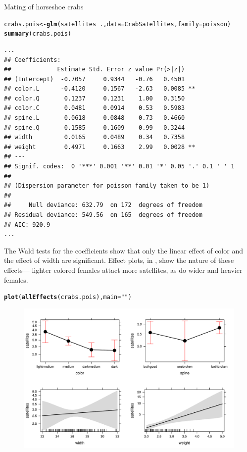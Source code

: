 \documentclass[11pt]{book}\usepackage[]{graphicx}\usepackage[]{color}
\makeatletter
\newcommand{\hlstr}[1]{\textcolor[rgb]{0.192,0.494,0.8}{#1}}%
\newcommand{\hlopt}[1]{\textcolor[rgb]{0,0,0}{#1}}%
\newcommand{\hlstd}[1]{\textcolor[rgb]{0.345,0.345,0.345}{#1}}%
\newcommand{\hlkwb}[1]{\textcolor[rgb]{0.69,0.353,0.396}{#1}}%
\newcommand{\hlkwc}[1]{\textcolor[rgb]{0.333,0.667,0.333}{#1}}%
\newcommand{\hlkwd}[1]{\textcolor[rgb]{0.737,0.353,0.396}{\textbf{#1}}}%
\newenvironment{kframe}{%
 \def\at@end@of@kframe{}%
 \ifinner\ifhmode%
  \def\at@end@of@kframe{\end{minipage}}%
  \begin{minipage}{\columnwidth}%
 \fi\fi%
 \def\FrameCommand##1{\hskip\@totalleftmargin \hskip-\fboxsep
 \colorbox{shadecolor}{##1}\hskip-\fboxsep
     \hskip-\linewidth \hskip-\@totalleftmargin \hskip\columnwidth}%
 \MakeFramed {\advance\hsize-\width
   \@totalleftmargin\z@ \linewidth\hsize
   \@setminipage}}%
 {\par\unskip\endMakeFramed%
 \at@end@of@kframe}
\newenvironment{knitrout}{}{} %
\renewenvironment{knitrout}{\small\renewcommand{\baselinestretch}{.85}}{} %
\makeatother
\begin{document}
\begin{Example}[crabs1]{Mating of horseshoe crabs}
\begin{knitrout}
\color{fgcolor}\begin{kframe}
\begin{alltt}
\hlstd{crabs.pois} \hlkwb{<-} \hlkwd{glm}\hlstd{(satellites} \hlopt{~} \hlstd{.,} \hlkwc{data}\hlstd{=CrabSatellites,} \hlkwc{family}\hlstd{=poisson)}
\hlkwd{summary}\hlstd{(crabs.pois)}
\end{alltt}
\begin{verbatim}
...
## Coefficients:
##             Estimate Std. Error z value Pr(>|z|)   
## (Intercept)  -0.7057     0.9344   -0.76   0.4501   
## color.L      -0.4120     0.1567   -2.63   0.0085 **
## color.Q       0.1237     0.1231    1.00   0.3150   
## color.C       0.0481     0.0914    0.53   0.5983   
## spine.L       0.0618     0.0848    0.73   0.4660   
## spine.Q       0.1585     0.1609    0.99   0.3244   
## width         0.0165     0.0489    0.34   0.7358   
## weight        0.4971     0.1663    2.99   0.0028 **
## ---
## Signif. codes:  0 '***' 0.001 '**' 0.01 '*' 0.05 '.' 0.1 ' ' 1
## 
## (Dispersion parameter for poisson family taken to be 1)
## 
##     Null deviance: 632.79  on 172  degrees of freedom
## Residual deviance: 549.56  on 165  degrees of freedom
## AIC: 920.9
...
\end{verbatim}
\end{kframe}
\end{knitrout}
The Wald tests for the coefficients show that only the linear effect of color and the effect
of width are significant.  
Effect plots, in , show the nature of these
effects--- lighter colored females attact more satellites, as do wider and heavier females.

\begin{knitrout}
\color{fgcolor}\begin{kframe}
\begin{alltt}
\hlkwd{plot}\hlstd{(}\hlkwd{allEffects}\hlstd{(crabs.pois),} \hlkwc{main}\hlstd{=}\hlstr{""}\hlstd{)}
\end{alltt}
\end{kframe}\begin{figure}[!htbp]


\centerline{\includegraphics[width=\textwidth]{ch09/fig/crabs1-eff1} }


\end{figure}
\end{knitrout}
\end{Example}
\end{document}
